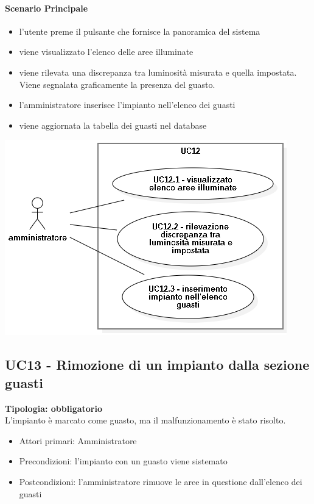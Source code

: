 \documentclass[12pt]{article}
\begin{document}
\paragraph{Scenario Principale}
\begin{itemize}
	\item l'utente preme il pulsante che fornisce la panoramica del sistema
	\item viene visualizzato l'elenco delle aree illuminate
	\item viene rilevata una discrepanza tra luminosità misurata e quella impostata. Viene segnalata graficamente la presenza del guasto.
	\item l'amministratore inserisce l'impianto nell'elenco dei guasti
	\item viene aggiornata la tabella dei guasti nel database
\end{itemize}

\includegraphics[scale=0.5]{UC12.png}

\subsection{UC13 - Rimozione di un impianto dalla sezione guasti}
\textbf{Tipologia: obbligatorio} \\
L'impianto è marcato come guasto, ma il malfunzionamento è stato risolto.
\begin{itemize}
	\item Attori primari: Amministratore
	\item Precondizioni: l'impianto con un guasto viene sistemato
	\item Postcondizioni: l'amministratore rimuove le aree in questione dall'elenco dei guasti
\end{itemize}
\end{document}
